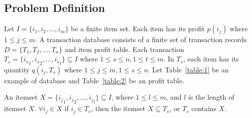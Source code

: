 \documentclass[runningheads,a4paper]{llncs}
\begin{document}
\subsection{Problem Definition}
Let $ I = \{i_{1},i_{2},\ldots,i_{m}\} $ be a finite item set. Each item has its profit $p(i_{j})$ where $ 1{\le}j{\le}m$. A transaction database consists of a finite set of transaction records $ D = \{T_{1},T_{2},\ldots,T_{n}\} $ and item profit table. Each transaction $ T_{s} = \{ {i_{s}}_{1},{i_{s}}_{2},\ldots,{i_{s}}_{t} \} \subseteq I$ where $1{\le}s{\le}n, 1{\le}t{\le}m$. In $ T_{s} $, each item has its quantity $ q(i_{j},T_{s}) $ where $ 1{\le}j{\le}m, 1{\le}s{\le}n$. Let Table~\ref{table:1} be an example of database and Table~\ref{table:2} be an profit table.

An itemset $ X = \{{i_{j}}_{1},{i_{j}}_{2},\ldots,{i_{j}}_{l}\} \subseteq I $, where $ 1{\le}l{\le}m $, and $ l $ is the length of itemset $ X $. $ \forall i_{j} \in X$  if $ i_{j} \in T_{s}$, then the itemset $ X \subseteq T_{s} $, or $ T_{s} $ contains $ X $.
\end{document}
